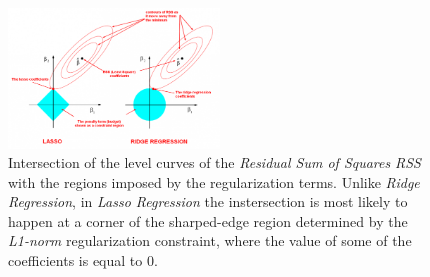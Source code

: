 \begin{figure}[H]
  \centering
  \includegraphics[width=0.5\textwidth]{files/figures/method/lasso-regression}
  \caption{Intersection of the level curves of the \textit{Residual Sum of Squares}
  \textit{RSS} with the regions imposed by the regularization terms. Unlike
  \textit{Ridge Regression}, in \textit{Lasso Regression} the instersection is
  most likely to happen at a corner of the sharped-edge region determined by the
  \textit{L1-norm} regularization constraint, where the value of some of the coefficients
  is equal to 0.}
\end{figure}


